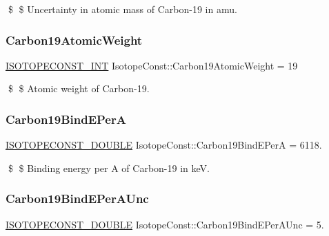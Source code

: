 \$ \$ Uncertainty in atomic mass of Carbon-\/19 in amu. \mbox{\label{group___isotope_const-_carbon-_c19_ga6120d363ad0b694a20d0bde1c0619ea2}} 
\subsubsection{\texorpdfstring{Carbon19\+Atomic\+Weight}{Carbon19AtomicWeight}}
{\footnotesize\ttfamily \mbox{\hyperlink{group___isotope_const-_macros_ga5f18360b3e99483a35c32d789e62621c}{I\+S\+O\+T\+O\+P\+E\+C\+O\+N\+S\+T\+\_\+\+I\+NT}} Isotope\+Const\+::\+Carbon19\+Atomic\+Weight = 19}

\$ \$ Atomic weight of Carbon-\/19. \mbox{\label{group___isotope_const-_carbon-_c19_gabae202e93bc7e9643ca27445d1e12680}} 
\subsubsection{\texorpdfstring{Carbon19\+Bind\+E\+PerA}{Carbon19BindEPerA}}
{\footnotesize\ttfamily \mbox{\hyperlink{group___isotope_const-_macros_ga8f45a7272ce02c0b4c65c44636ed719a}{I\+S\+O\+T\+O\+P\+E\+C\+O\+N\+S\+T\+\_\+\+D\+O\+U\+B\+LE}} Isotope\+Const\+::\+Carbon19\+Bind\+E\+PerA = 6118.}

\$ \$ Binding energy per A of Carbon-\/19 in keV. \mbox{\label{group___isotope_const-_carbon-_c19_ga2a0f97f66c454f67d71cff9bb17ec370}} 
\subsubsection{\texorpdfstring{Carbon19\+Bind\+E\+Per\+A\+Unc}{Carbon19BindEPerAUnc}}
{\footnotesize\ttfamily \mbox{\hyperlink{group___isotope_const-_macros_ga8f45a7272ce02c0b4c65c44636ed719a}{I\+S\+O\+T\+O\+P\+E\+C\+O\+N\+S\+T\+\_\+\+D\+O\+U\+B\+LE}} Isotope\+Const\+::\+Carbon19\+Bind\+E\+Per\+A\+Unc = 5.}

